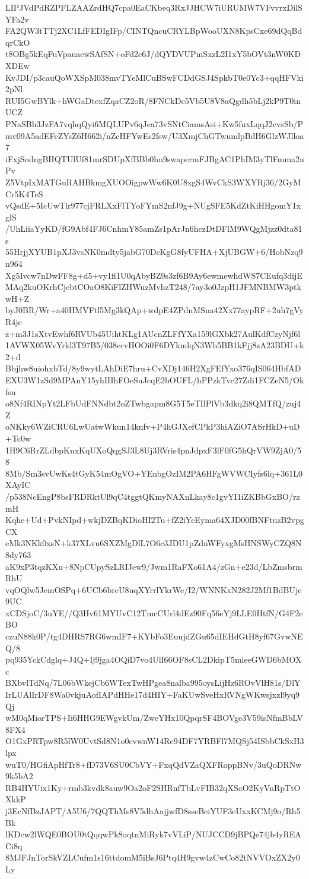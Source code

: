 LIPJVdPdRZPFLZAAZrdHQ7cpa0EaCKbeq3RxJJHCW7iURUMW7VFvvrxDilSYFa2v
FA2QW3tTTj2XC1LfFEDIgIFp/CINTQncuCRYLBpWooUXN8KpsCxe69dQqBdqrCkO
t8OBg5kEqFuVpauaewSAfSN+oFd2c6J/dQYDVUPmSxzL2I1xY5bOVt3nW0KDXDEw
KvJDI/p3cauQoWXSpM038mvTYeMlCuBSwFCDdGSJ4SpkbT0e0Yc3+qqHFVki2pNl
RUI5GwBYlk+hWGaDtexfZqaCZ2oR/8FNCkDc5Vb5U8V8aQgdh5bLj2kP9T0inUCZ
PNaSBh3JzFA7vqhqQyi6MQLUPv6qJea73vSNtCiamsAsi+Kw5fuxLqqJ2cvsSb/P
mv09A5adEFcZYsZ6H662i/nZcHFYwEs2fsw/U3XmjChGTwumlpBdH6GlzWJlloa7
iFxjSodngBHQTUlUf81mrSDUpXfBBb0hn9swapermFJBgAC1PhIM3yTlFmma2uPv
Z5VtpIxMATGuRAHBkmgXUOOigpwWw6K0U8xgS4WvCkS3WXYRj36/2GyMCr5K4TeS
vQsdE+5IcUwTlr977cjFRLXxFlTYoFYmS2nfJ9g+NUgSFE5KdZtKiHHgomY1xglS
/UhLiiaYyKD/fG9Abf4FJ6CnhmY85amZs1pArJn6hczDtDFlM9WQgMjzz0dta81s
55HrjjXYUB1pXJ3vsNK0mdty5jabG70DcKgG8fyUFHA+XjUBGW+6/HobNzq9n964
Xg5Ivcw7nDwFF8g+d5+vy1fi1U0qAbyBZ9s3zf6B9Ay6ewmewhdWS7CEufq3dijE
MAq2kuOKrhCjcbtCOaO8KiFlZHWuzMvhzT248/7ay3o0JzpH1JFMNBMW3ptkwH+Z
byJ0BR/Wr+a40HMVFtl5Mg3kQAp+wdpE4ZPdnMSna42Xx77aypRF+2uh7gVyR4je
z+m3J1sXtvEwhf6RVUb45UihtKLg1AUcnZLFfYXa159lGXbk27AulKdfCzyNjf6l
1AVWX05WvYrkl3T97B5/038ervHOOi0F6DYkmlqN3Wh5BB1kFjj8zA23BDU+k2+d
Bbjhw8uiohxbTd/8y9wytLAhDiE7hru+CvXDj146H2XgFEfYxo376qIS064HbfAD
EXU3W1zSd9MPAnY15yhIHhFOeSuJcqE2bOUFL/hPPzkTvc27Zdi1FCZeN5/Okfsn
o8Nf4RINpYt2LFbUdFNNdbt2oZTwbgapm8G5T5eTIlPlVb3dkq2i8QMTfQ/zuj4Z
oNKky6WZiCRU6LwUatwWkun14knfv+P4hGJXefCPkP3hiAZiO7ASrHkD+uD+Tc0w
1H9C6RrZLdbpKnxKqUXoQqgSJ3L8Uj3RVris4pnJdpxF3lF0fG5hQrVW9ZjA0/58
8Mb/Sm3svUwKs4tGyK54mOgVO+YEnbgOzIM2PA6HFgWVWCIyfs6lq+361L0XAyIC
/p538NcEngP8bsFRDRktUl9qC4tggtQKmyNAXnLkay8c1gvYI1iZKBbGxBO/rzmH
Kqhe+Ud+PvkNIpd+wkjDZBqKDioHI2Tu+fZ2iYcEyma64XJD00fBNFtuzB2vpgCX
eMk3NKk0xsN+k37XLvu6SXZMgDlL7O6c3JDU1pZdnWFyxgMsHNSWyCZQ8N8dy763
aK9xP3tqzKXu+8NpCUpySzLRIJew9/Jwm1RaFXo61A4/zGn+e23d/LbZmsbrmRhU
vqOQlw5JemOSPq+6UCb6breU8uqXYrrlYkrWe/I2/WNNKxN282J2Mf1BdBUje9UC
xCDSjoC/3uYE//Q3Hv61MYUvC12TmcCUrl4dEz90Fq56eYj9LLE0HtfN/G4F2eBO
czuN88k0P/tg4DHRS7RG6wmIF7+KYbFo3EuujdZGu65dIEHdGtH8yf67GvwNEQ/8
pq935YckCdglq+J4Q+Ij9jga4OQiD7vo4UlI66OF8sCL2DkipT5mleeGWD6bMOXc
BXbvlTdNq/7L06bWkejCb6WTexTwHPgea8nalba995oysLijHz6ROvVlH81s/DlY
IrLUAlIrDF8Wa0vkjuAofIAPdHHe17d4HIY+FaKUwSveHxRVNgWKwsjxzl9yq9Qj
wM0qMiorTPS+Ii6HHG9EWgvkUm/ZweYHx10QpqrSF4BOVge3V59isNfmBbLV8FX4
O1GxPRTpw8R5lW0UvtSd8N1o0cvwnW14Re94DF7YRBFl7MQSj54ISbbCkSxH3lpx
wuT0/HGfiApHfTr8+fD73V6SU0CbVY+FxqQdVZaQXFRoppBNv/3uQoDRNw9k5bA2
RB4HYUix1Ky+rmb3kvdk8auw9Oa2oF2SHRnfTbLvFIB32qXSaO2KyVnRpTtOXkkP
j3EcNfBzJAPT/A5U6/7QQThMs8V5dhAajjwfD8sseBeiYUF3eUxxKCMj9o/Rh5Bk
lKDcw2lWQE0BOU0tQqqwPk8oqtnMiRyk7vVLiP/NUJCCD9jBPQe74jb4yREACi8q
8MJFJnTorSkVZLCufm1s16ttdomM5iBsJ6Ptq4H9gvw4zCwCo82tNVVOxZX2y0Ly
